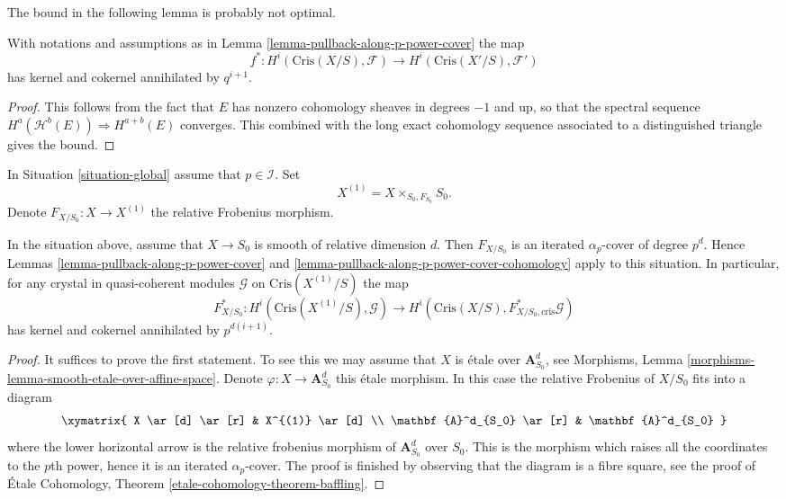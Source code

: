 \noindent
The bound in the following lemma is probably not optimal.

\begin{lemma}
\label{lemma-pullback-along-p-power-cover-cohomology}
With notations and assumptions as in
Lemma \ref{lemma-pullback-along-p-power-cover}
the map
$$
f^* :
H^i(\text{Cris}(X/S), \mathcal{F})
\longrightarrow
H^i(\text{Cris}(X'/S), \mathcal{F}')
$$
has kernel and cokernel annihilated by $q^{i + 1}$.
\end{lemma}

\begin{proof}
This follows from the fact that $E$ has nonzero cohomology sheaves in
degrees $-1$ and up, so that the spectral sequence
$H^a(\mathcal{H}^b(E)) \Rightarrow H^{a + b}(E)$ converges.
This combined with the long exact cohomology sequence associated
to a distinguished triangle gives the bound.
\end{proof}

\noindent
In Situation \ref{situation-global} assume that $p \in \mathcal{I}$.
Set
$$
X^{(1)} = X \times_{S_0, F_{S_0}} S_0.
$$
Denote $F_{X/S_0} : X \to X^{(1)}$ the relative Frobenius morphism.

\begin{lemma}
\label{lemma-pullback-relative-frobenius}
In the situation above, assume that $X \to S_0$ is smooth of relative
dimension $d$. Then $F_{X/S_0}$ is an iterated $\alpha_p$-cover
of degree $p^d$. Hence Lemmas \ref{lemma-pullback-along-p-power-cover} and
\ref{lemma-pullback-along-p-power-cover-cohomology} apply to this
situation. In particular, for any crystal in quasi-coherent modules
$\mathcal{G}$ on $\text{Cris}(X^{(1)}/S)$ the map
$$
F_{X/S_0}^* : H^i(\text{Cris}(X^{(1)}/S), \mathcal{G})
\longrightarrow
H^i(\text{Cris}(X/S), F_{X/S_0, \text{cris}}^*\mathcal{G})
$$
has kernel and cokernel annihilated by $p^{d(i + 1)}$.
\end{lemma}

\begin{proof}
It suffices to prove the first statement. To see this we may assume
that $X$ is \'etale over $\mathbf{A}^d_{S_0}$, see
Morphisms, Lemma \ref{morphisms-lemma-smooth-etale-over-affine-space}.
Denote $\varphi : X \to \mathbf{A}^d_{S_0}$ this \'etale morphism.
In this case the relative Frobenius of $X/S_0$ fits into a diagram
$$
\xymatrix{
X \ar[d] \ar[r] & X^{(1)} \ar[d] \\
\mathbf{A}^d_{S_0} \ar[r] & \mathbf{A}^d_{S_0}
}
$$
where the lower horizontal arrow is the relative frobenius morphism
of $\mathbf{A}^d_{S_0}$ over $S_0$. This is the morphism which raises
all the coordinates to the $p$th power, hence it is an iterated
$\alpha_p$-cover. The proof is finished by observing that the diagram
is a fibre square, see the proof of
\'Etale Cohomology, Theorem \ref{etale-cohomology-theorem-baffling}.
\end{proof}













